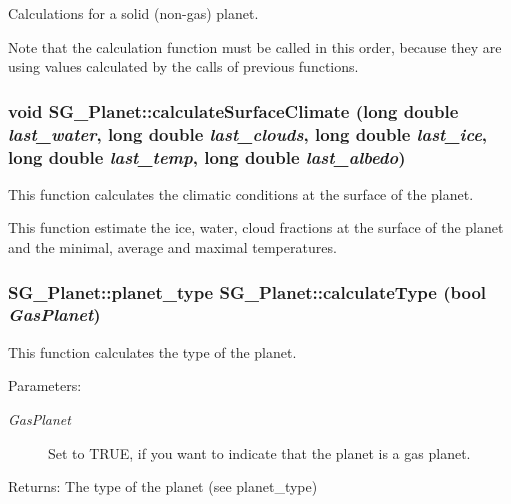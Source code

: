 Calculations for a solid (non-gas) planet. 

Note that the calculation function must be called in this order, because they are using values calculated by the calls of previous functions. 
\subsubsection{\setlength{\rightskip}{0pt plus 5cm}void SG\_\-Planet::calculate\-Surface\-Climate (long double {\em last\_\-water}, long double {\em last\_\-clouds}, long double {\em last\_\-ice}, long double {\em last\_\-temp}, long double {\em last\_\-albedo})\hspace{0.3cm}{\tt  [protected]}}\label{class_s_g___planet_b24}


This function calculates the climatic conditions at the surface of the planet. 

This function estimate the ice, water, cloud fractions at the surface of the planet and the minimal, average and maximal temperatures. 
\subsubsection{\setlength{\rightskip}{0pt plus 5cm}SG\_\-Planet::planet\_\-type SG\_\-Planet::calculate\-Type (bool {\em Gas\-Planet})\hspace{0.3cm}{\tt  [protected]}}\label{class_s_g___planet_b6}


This function calculates the type of the planet. 

\begin{Desc}
\item[Parameters:]
\begin{description}
\item[{\em Gas\-Planet}]Set to TRUE, if you want to indicate that the planet is a gas planet. \end{description}
\end{Desc}
\begin{Desc}
\item[Returns:]The type of the planet (see planet\_\-type) \end{Desc}
